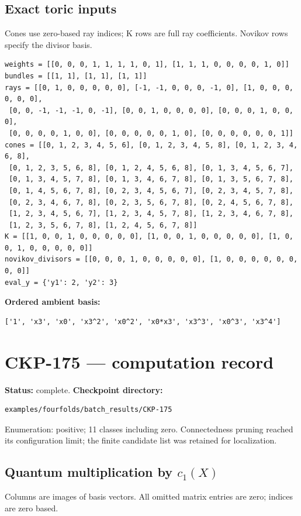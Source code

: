 \documentclass[10pt,a4paper]{article}
\begin{document}
\subsection*{Exact toric inputs}
Cones use zero-based ray indices; K rows are full ray coefficients. Novikov rows specify the divisor basis.

\begin{lstlisting}
weights = [[0, 0, 0, 1, 1, 1, 1, 0, 1], [1, 1, 1, 0, 0, 0, 0, 1, 0]]
bundles = [[1, 1], [1, 1], [1, 1]]
rays = [[0, 1, 0, 0, 0, 0, 0], [-1, -1, 0, 0, 0, -1, 0], [1, 0, 0, 0, 0, 0, 0],
 [0, 0, -1, -1, -1, 0, -1], [0, 0, 1, 0, 0, 0, 0], [0, 0, 0, 1, 0, 0, 0],
 [0, 0, 0, 0, 1, 0, 0], [0, 0, 0, 0, 0, 1, 0], [0, 0, 0, 0, 0, 0, 1]]
cones = [[0, 1, 2, 3, 4, 5, 6], [0, 1, 2, 3, 4, 5, 8], [0, 1, 2, 3, 4, 6, 8],
 [0, 1, 2, 3, 5, 6, 8], [0, 1, 2, 4, 5, 6, 8], [0, 1, 3, 4, 5, 6, 7],
 [0, 1, 3, 4, 5, 7, 8], [0, 1, 3, 4, 6, 7, 8], [0, 1, 3, 5, 6, 7, 8],
 [0, 1, 4, 5, 6, 7, 8], [0, 2, 3, 4, 5, 6, 7], [0, 2, 3, 4, 5, 7, 8],
 [0, 2, 3, 4, 6, 7, 8], [0, 2, 3, 5, 6, 7, 8], [0, 2, 4, 5, 6, 7, 8],
 [1, 2, 3, 4, 5, 6, 7], [1, 2, 3, 4, 5, 7, 8], [1, 2, 3, 4, 6, 7, 8],
 [1, 2, 3, 5, 6, 7, 8], [1, 2, 4, 5, 6, 7, 8]]
K = [[1, 0, 0, 1, 0, 0, 0, 0, 0], [1, 0, 0, 1, 0, 0, 0, 0, 0], [1, 0, 0, 1, 0, 0, 0, 0, 0]]
novikov_divisors = [[0, 0, 0, 1, 0, 0, 0, 0, 0], [1, 0, 0, 0, 0, 0, 0, 0, 0]]
eval_y = {'y1': 2, 'y2': 3}
\end{lstlisting}

\textbf{Ordered ambient basis:}
\begin{lstlisting}
['1', 'x3', 'x0', 'x3^2', 'x0^2', 'x0*x3', 'x3^3', 'x0^3', 'x3^4']
\end{lstlisting}

\clearpage\section*{CKP-175 --- computation record}
\textbf{Status:} complete.
\textbf{Checkpoint directory:}
\begin{lstlisting}
examples/fourfolds/batch_results/CKP-175
\end{lstlisting}

Enumeration: positive; 11 classes including zero.
Connectedness pruning reached its configuration limit; the finite candidate list was retained for localization.
\subsection*{Quantum multiplication by $c_1(X)$}
Columns are images of basis vectors. All omitted matrix entries are zero; indices are zero based.
\end{document}
